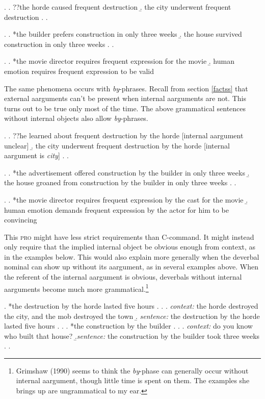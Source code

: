 \documentclass[12pt]{article}
\begin{document}
\singlespacing

\ex.
\a. ??the horde caused frequent destruction
\b. the city underwent frequent destruction
\z. \z.

\ex. 
\a. *the builder prefers construction in only three weeks
\b. the house survived construction in only three weeks
\z. \z.

\ex. 
\a. *the movie director requires frequent expression for the movie
\b. human emotion requires frequent expression to be valid

\doublespacing

The same phenomena occurs with \textit{by}-phrases. Recall from section \ref{factss} that external aarguments can't be present when internal aarguments are not. This turns out to be true only most of the time. The above grammatical sentences without internal objects also allow \textit{by}-phrases.

\singlespacing

\ex.
\a. ??he learned about frequent destruction by the horde \hfill [internal aargument unclear]
\b. the city underwent frequent destruction by the horde \hfill [internal aargument is \textit{city}]
\z. \z.

\ex. 
\a. *the advertisement offered construction by the builder in only three weeks
\b. the house groaned from construction by the builder in only three weeks
\z. \z.

\ex. 
\a. *the movie director requires frequent expression by the cast for the movie
\b. human emotion demands frequent expression by the actor for him to be convincing

\doublespacing

This \textsc{pro} might have less strict requirements than C-command. It might instead only require that the implied internal object be obvious enough from context, as in the examples below. This would also explain more generally when the deverbal nominal can show up without its aargument, as in several examples above. When the referent of the internal aargument is obvious, deverbals without internal aarguments become much more grammatical.\footnote{ Grimshaw (1990) seems to think the \textit{by}-phase can generally occur without internal aargument, though little time is spent on them. The examples she brings up are ungrammatical to my ear.}

\singlespacing

\ex. *the destruction by the horde lasted five hours
\z.
\ex.
\a. \textit{context:} the horde destroyed the city, and the mob destroyed the town
\b. \textit{sentence:} the destruction by the horde lasted five hours\footnotemark
\z. \z.
\ex. *the construction by the builder
\z.
\ex. 
\a. \textit{context:} do you know who built that house?
\b.\textit{sentence:} the construction by the builder took three weeks
\z. \z. \par
\end{document}
